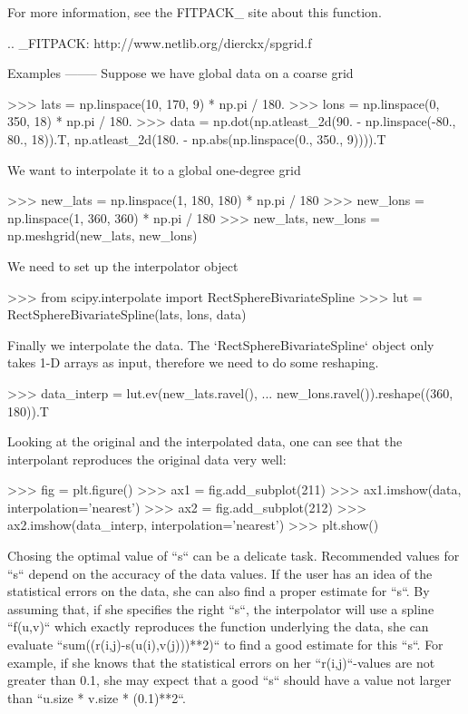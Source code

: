 \begin{DoxyVerb}
For more information, see the FITPACK_ site about this function.

.. _FITPACK: http://www.netlib.org/dierckx/spgrid.f

Examples
--------
Suppose we have global data on a coarse grid

>>> lats = np.linspace(10, 170, 9) * np.pi / 180.
>>> lons = np.linspace(0, 350, 18) * np.pi / 180.
>>> data = np.dot(np.atleast_2d(90. - np.linspace(-80., 80., 18)).T,
                  np.atleast_2d(180. - np.abs(np.linspace(0., 350., 9)))).T

We want to interpolate it to a global one-degree grid

>>> new_lats = np.linspace(1, 180, 180) * np.pi / 180
>>> new_lons = np.linspace(1, 360, 360) * np.pi / 180
>>> new_lats, new_lons = np.meshgrid(new_lats, new_lons)

We need to set up the interpolator object

>>> from scipy.interpolate import RectSphereBivariateSpline
>>> lut = RectSphereBivariateSpline(lats, lons, data)

Finally we interpolate the data.  The `RectSphereBivariateSpline` object
only takes 1-D arrays as input, therefore we need to do some reshaping.

>>> data_interp = lut.ev(new_lats.ravel(),
...                      new_lons.ravel()).reshape((360, 180)).T

Looking at the original and the interpolated data, one can see that the
interpolant reproduces the original data very well:

>>> fig = plt.figure()
>>> ax1 = fig.add_subplot(211)
>>> ax1.imshow(data, interpolation='nearest')
>>> ax2 = fig.add_subplot(212)
>>> ax2.imshow(data_interp, interpolation='nearest')
>>> plt.show()

Chosing the optimal value of ``s`` can be a delicate task. Recommended
values for ``s`` depend on the accuracy of the data values.  If the user
has an idea of the statistical errors on the data, she can also find a
proper estimate for ``s``. By assuming that, if she specifies the
right ``s``, the interpolator will use a spline ``f(u,v)`` which exactly
reproduces the function underlying the data, she can evaluate
``sum((r(i,j)-s(u(i),v(j)))**2)`` to find a good estimate for this ``s``.
For example, if she knows that the statistical errors on her
``r(i,j)``-values are not greater than 0.1, she may expect that a good
``s`` should have a value not larger than ``u.size * v.size * (0.1)**2``.


\end{DoxyVerb}
